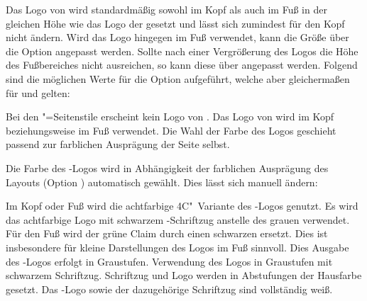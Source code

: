 \begin{DeclareEntity*}{}
\begin{DeclareEntity*}{}
\begin{DeclareEntity*}{}
\begin{Declaration}
\begin{Declaration}
\begin{Declaration}
Das Logo von \DDC wird standardmäßig sowohl im Kopf als auch im Fuß in der 
gleichen Höhe wie das Logo der \TnUD gesetzt und lässt sich zumindest für den 
Kopf nicht ändern. Wird das Logo hingegen im Fuß verwendet, kann die Größe über 
die Option  angepasst werden. Sollte nach einer 
Vergrößerung des Logos die Höhe des Fußbereiches nicht ausreichen, so kann 
diese über  angepasst werden. Folgend sind 
die möglichen Werte für die Option  aufgeführt, welche aber 
gleichermaßen für  und  gelten:
%
\begin{DeclareValues}{}
  Bei den "=Seitenstile erscheint kein Logo von \DDC.
  Das Logo von \DDC wird im Kopf beziehungsweise im Fuß verwendet. Die Wahl der 
  Farbe des Logos geschieht passend zur farblichen Ausprägung der Seite selbst.
\end{DeclareValues}

Die Farbe des \DDC-Logos wird in Abhängigkeit der farblichen Ausprägung des 
Layouts (Option ) automatisch gewählt. Dies lässt sich 
manuell ändern:
%
\begin{DeclareValues}{}
  Im Kopf oder Fuß wird die achtfarbige 4C"~Variante des \DDC-Logos genutzt.
  Es wird das achtfarbige Logo mit schwarzem \DDC-Schriftzug anstelle des 
  grauen verwendet. Für den Fuß wird der grüne Claim durch einen schwarzen 
  ersetzt. Dies ist insbesondere für kleine Darstellungen des Logos im Fuß 
  sinnvoll.
  Dies Ausgabe des \DDC-Logos erfolgt in Graustufen.
  Verwendung des Logos in Graustufen mit schwarzem Schriftzug.
  Schriftzug und Logo werden in Abstufungen der Hausfarbe  gesetzt.
  Das \DDC-Logo sowie der dazugehörige Schriftzug sind vollständig weiß.
\end{DeclareValues}
\end{Declaration}
\end{Declaration}
\end{Declaration}


\end{DeclareEntity*}
\end{DeclareEntity*}
\end{DeclareEntity*}
